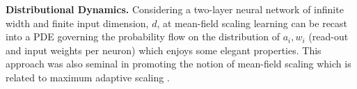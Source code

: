 {\bf Distributional Dynamics.} Considering a two-layer neural network of infinite width and finite input dimension, $d$, at mean-field scaling learning can be recast into a PDE governing the probability flow \citep{MeiMeanField2018,sirignano2020mean,rotskoff2022trainability} on the distribution of $a_i,w_i$ (read-out and input weights per neuron) which enjoys some elegant properties. This approach was also seminal in promoting the notion of mean-field scaling which is related to maximum adaptive scaling  \citep{yang2019scaling,yang2022tensorprogramsvtuning}.

